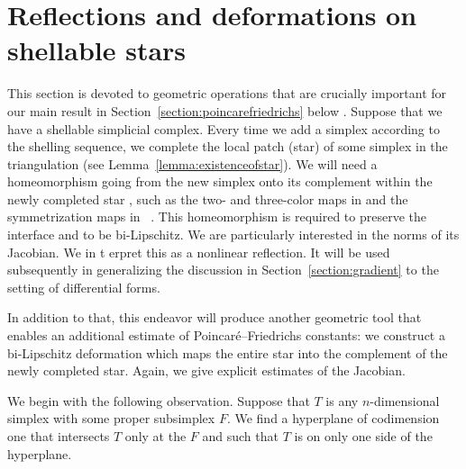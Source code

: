 \documentclass[10pt,letterpaper]{article}
\newcommand\cye[1]{%
  \protect\leavevmode
  \begingroup
    \color{red!35!yellow}%
    #1%
  \endgroup
}
\begin{document}
\section{Reflections and deformations on shellable stars}\label{section:extension}

This section is devoted to geometric operations that are crucially important for our main result \cye{in Section~\ref{section:poincarefriedrichs} below}. 
Suppose that we have a shellable simplicial complex. 
Every time we add a simplex according to the shelling sequence, 
we complete the local \cye{patch} (star) of some simplex in the triangulation (see Lemma~\ref{lemma:existenceofstar}).
We will need a homeomorphism going from the new simplex onto its complement within the newly completed star\cye{, such as the two- and three-color maps in \cite[Sections~5.3 and~6.3]{ern2020stable} and the symmetrization maps in~\cite[Section~7.6]{Chaum_Voh_p_rob_3D_H_curl_24}}.
This homeomorphism is required to preserve the interface and to be bi-Lipschitz.
We are particularly interested in the norms of its Jacobian.
We in\cye{t}erpret this as a nonlinear reflection. It will be used subsequently in generalizing the discussion in Section~\ref{section:gradient} to the setting of differential forms. 

In addition to that, this endeavor will produce another geometric tool 
that enables an additional estimate \cye{of} Poincar\'e--Friedrichs constants:
we construct a bi-Lipschitz deformation which maps the entire star 
into the complement of the newly completed star. 
Again, we give explicit estimates of the Jacobian.



We begin with the following observation. 
Suppose that $T$ is any $n$-dimensional simplex with some proper subsimplex $F$.
We find a hyperplane of codimension one that intersects $T$ only at the $F$ and such that $T$ is on only one side of the hyperplane. 
\end{document}
